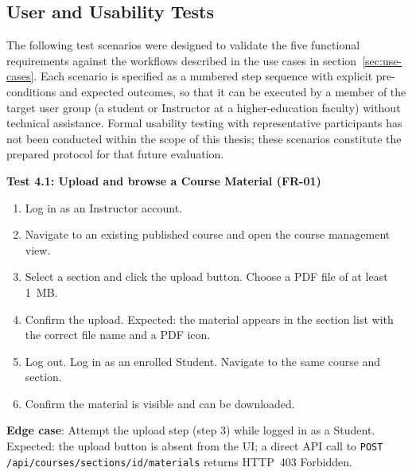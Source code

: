 \subsection{User and Usability Tests}
\label{subsec:user-tests}

The following test scenarios were designed to validate the five functional requirements against
the workflows described in the use cases in section~\ref{sec:use-cases}. Each scenario is
specified as a numbered step sequence with explicit pre-conditions and expected outcomes, so
that it can be executed by a member of the target user group (a student or Instructor at a
higher-education faculty) without technical assistance. Formal usability testing with
representative participants has not been conducted within the scope of this thesis; these
scenarios constitute the prepared protocol for that future evaluation.

\bigskip
\noindent\textbf{Test 4.1: Upload and browse a Course Material (FR-01)}
\begin{enumerate}
    \item Log in as an Instructor account.
    \item Navigate to an existing published course and open the course management view.
    \item Select a section and click the upload button. Choose a PDF file of at least 1~MB.
    \item Confirm the upload. Expected: the material appears in the section list with the correct
          file name and a PDF icon.
    \item Log out. Log in as an enrolled Student. Navigate to the same course and section.
    \item Confirm the material is visible and can be downloaded.
\end{enumerate}

\noindent\textbf{Edge case}: Attempt the upload step (step 3) while logged in as a Student.
Expected: the upload button is absent from the UI; a direct API call to
\texttt{POST /api/courses/sections/{id}/materials} returns HTTP~403 Forbidden.

